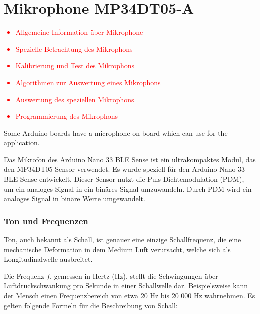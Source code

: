 %
%
%



\chapter{Mikrophone MP34DT05-A}\label{MicrophoneMP34DT05}



\textcolor{red}{
\begin{itemize}
    \item Allgemeine Information über Mikrophone
    \item Spezielle Betrachtung des Mikrophons
    \item Kalibrierung und Test des Mikrophons
    \item Algorithmen zur Auswertung eines Mikrophons
    \item Auswertung des speziellen Mikrophons
    \item Programmierung des Mikrophons
\end{itemize} 
}




Some Arduino boards have a microphone on board which can use for the application. 

Das Mikrofon des Arduino Nano 33 BLE Sense ist ein ultrakompaktes Modul, das den MP34DT05-Sensor verwendet. Es wurde speziell für den Arduino Nano 33 BLE Sense entwickelt. Dieser Sensor nutzt die Puls-Dichtemodulation (PDM), um ein analoges Signal in ein binäres Signal umzuwandeln. Durch PDM wird ein analoges Signal in binäre Werte umgewandelt. \cite{STMicroelectronics:2021b}



\subsection{Ton und Frequenzen}\label{Ton und Frequenz}

Ton, auch bekannt als Schall, ist genauer eine einzige Schallfrequenz, die eine mechanische Deformation in dem Medium Luft verursacht, welche sich als Longitudinalwelle ausbreitet.

Die Frequenz $f$, gemessen in Hertz (Hz), stellt die Schwingungen über Luftdruckschwankung pro Sekunde in einer Schallwelle dar. Beispielsweise kann der Mensch einen Frequenzbereich von etwa 20 Hz bis 20 000 Hz wahrnehmen.
Es gelten folgende Formeln für die Beschreibung von Schall:


